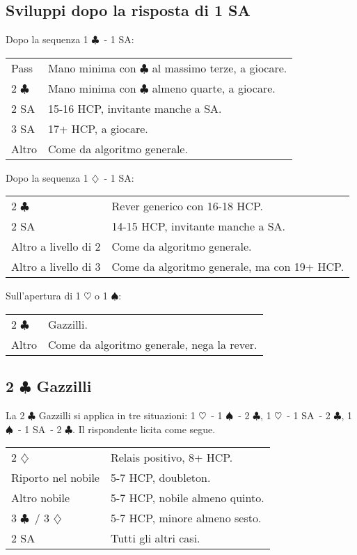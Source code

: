 \documentclass[a4paper,10pt]{article}
\renewcommand{\c}{$\clubsuit$\xspace}
\renewcommand{\d}{$\diamondsuit$\xspace}
\newcommand{\h}{$\heartsuit$\xspace}
\newcommand{\s}{$\spadesuit$\xspace}
\newcommand{\sa}{SA\xspace}
\newcommand{\smallspace}{\vskip0.3cm}
\newenvironment{twocol}
  {\smallspace\noindent\begin{tabular}{l p{0.78\textwidth}}}
  {\end{tabular}\smallspace}
\begin{document}
\subsection{Sviluppi dopo la risposta di 1 \sa}

\color{red}
\noindent Dopo la sequenza 1 \c\ - 1 \sa:
\begin{twocol}
	Pass & Mano minima con \c al massimo terze, a giocare. \\
	2 \c & Mano minima con \c almeno quarte, a giocare. \\
	2 \sa & 15-16 HCP, invitante manche a \sa.\\
	3 \sa & 17+ HCP, a giocare.\\
	Altro & Come da algoritmo generale.
\end{twocol}

\noindent Dopo la sequenza 1 \d\ - 1 \sa:
\begin{twocol}
	2 \c & Rever generico con 16-18 HCP.\\
	2 \sa & 14-15 HCP, invitante manche a \sa.\\
	Altro a livello di 2 & Come da algoritmo generale.\\
	Altro a livello di 3 & Come da algoritmo generale, ma con 19+ HCP.
\end{twocol}

\color{black}

\noindent Sull'apertura di 1 \h o 1 \s:
\begin{twocol}
  2 \c & Gazzilli. \\
  Altro & Come da algoritmo generale, nega la rever.
\end{twocol}


\subsection{2 \c Gazzilli} \label{gazzilli}

La 2 \c Gazzilli si applica in tre situazioni: 1 \h\ - 1 \s\ - 2 \c, 1 \h\ - 1 \sa\ - 2 \c, 1 \s\ - 1 \sa\ - 2 \c.
Il rispondente licita come segue.

\begin{twocol}
  2 \d & Relais positivo, 8+ HCP. \\
  Riporto nel nobile & 5-7 HCP, doubleton. \\
  Altro nobile & 5-7 HCP, nobile almeno quinto. \\
  3 \c\ / 3 \d & 5-7 HCP, minore almeno sesto. \\
  2 \sa & Tutti gli altri casi.
\end{twocol}
\end{document}
